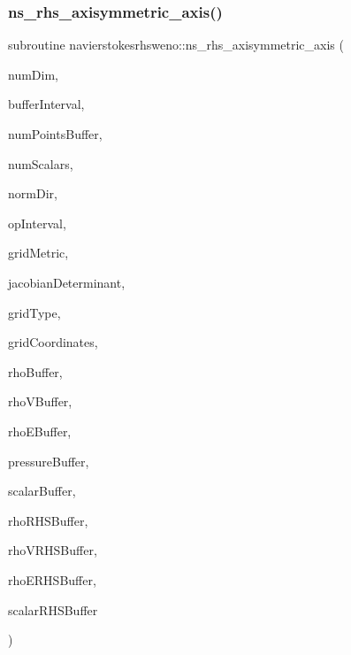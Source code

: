 \subsubsection{\texorpdfstring{ns\+\_\+rhs\+\_\+axisymmetric\+\_\+axis()}{ns\_rhs\_axisymmetric\_axis()}}
{\footnotesize\ttfamily subroutine navierstokesrhsweno\+::ns\+\_\+rhs\+\_\+axisymmetric\+\_\+axis (\begin{DoxyParamCaption}\item[{integer(kind=4)}]{num\+Dim,  }\item[{integer(kind=8), dimension(2$\ast$numdim), intent(in)}]{buffer\+Interval,  }\item[{integer(kind=8)}]{num\+Points\+Buffer,  }\item[{integer(kind=4)}]{num\+Scalars,  }\item[{integer(kind=4)}]{norm\+Dir,  }\item[{integer(kind=8), dimension(2$\ast$numdim), intent(in)}]{op\+Interval,  }\item[{real(kind=8), dimension(numdim$\ast$numdim$\ast$numpointsbuffer), intent(in)}]{grid\+Metric,  }\item[{real(kind=8), dimension(2$\ast$numpointsbuffer), intent(in)}]{jacobian\+Determinant,  }\item[{integer(kind=4)}]{grid\+Type,  }\item[{real(kind=8), dimension(numdim$\ast$numpointsbuffer), intent(in), target}]{grid\+Coordinates,  }\item[{real(kind=8), dimension(numpointsbuffer), intent(in)}]{rho\+Buffer,  }\item[{real(kind=8), dimension(numdim$\ast$numpointsbuffer), intent(in), target}]{rho\+V\+Buffer,  }\item[{real(kind=8), dimension(numpointsbuffer), intent(in)}]{rho\+E\+Buffer,  }\item[{real(kind=8), dimension(numpointsbuffer), intent(in)}]{pressure\+Buffer,  }\item[{real(kind=8), dimension(numscalars$\ast$numpointsbuffer), intent(in), target}]{scalar\+Buffer,  }\item[{real(kind=8), dimension(numpointsbuffer), intent(inout)}]{rho\+R\+H\+S\+Buffer,  }\item[{real(kind=8), dimension(numdim$\ast$numpointsbuffer), intent(inout), target}]{rho\+V\+R\+H\+S\+Buffer,  }\item[{real(kind=8), dimension(numpointsbuffer), intent(inout)}]{rho\+E\+R\+H\+S\+Buffer,  }\item[{real(kind=8), dimension(numscalars$\ast$numpointsbuffer), intent(inout), target}]{scalar\+R\+H\+S\+Buffer }\end{DoxyParamCaption})}



